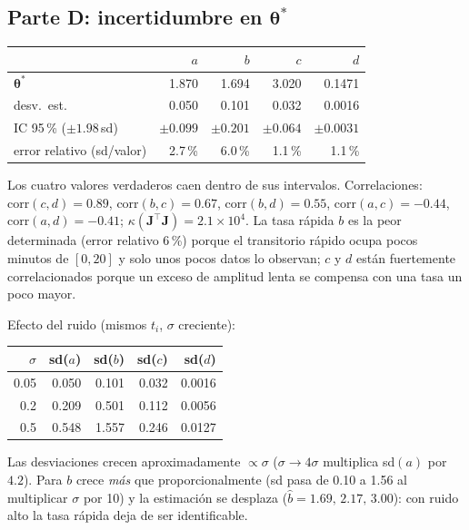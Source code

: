 \documentclass[11pt,letterpaper]{article}
\newcommand{\tht}{\boldsymbol{\theta}}
\begin{document}
\subsection*{Parte D: incertidumbre en $\tht^\ast$}
\begin{center}\small
\begin{tabular}{lrrrr}
\toprule
& $a$ & $b$ & $c$ & $d$\\
\midrule
$\tht^\ast$ & 1.870 & 1.694 & 3.020 & 0.1471\\
desv.\ est. & 0.050 & 0.101 & 0.032 & 0.0016\\
IC 95\,\% ($\pm1.98\,$sd) & $\pm0.099$ & $\pm0.201$ & $\pm0.064$ & $\pm0.0031$\\
error relativo (sd/valor) & 2.7\,\% & 6.0\,\% & 1.1\,\% & 1.1\,\%\\
\bottomrule
\end{tabular}
\end{center}
Los cuatro valores verdaderos caen dentro de sus intervalos. Correlaciones: $\mathrm{corr}(c,d)=0.89$,
$\mathrm{corr}(b,c)=0.67$, $\mathrm{corr}(b,d)=0.55$, $\mathrm{corr}(a,c)=-0.44$, $\mathrm{corr}(a,d)=-0.41$;
$\kappa(\mathbf J^\top\mathbf J)=2.1\times10^4$. La tasa r\'apida $b$ es la peor determinada (error relativo $6$\,\%)
porque el transitorio r\'apido ocupa pocos minutos de $[0,20]$ y solo unos pocos datos lo observan; $c$ y $d$
est\'an fuertemente correlacionados porque un exceso de amplitud lenta se compensa con una tasa un poco mayor.

Efecto del ruido (mismos $t_i$, $\sigma$ creciente):
\begin{center}\small
\begin{tabular}{rrrrr}
\toprule
$\sigma$ & sd($a$) & sd($b$) & sd($c$) & sd($d$)\\
\midrule
0.05 & 0.050 & 0.101 & 0.032 & 0.0016\\
0.2 & 0.209 & 0.501 & 0.112 & 0.0056\\
0.5 & 0.548 & 1.557 & 0.246 & 0.0127\\
\bottomrule
\end{tabular}
\end{center}
Las desviaciones crecen aproximadamente $\propto\sigma$ ($\sigma\to4\sigma$ multiplica sd$(a)$ por $4.2$). Para $b$ crece
\emph{m\'as} que proporcionalmente (sd pasa de 0.10 a 1.56 al multiplicar $\sigma$ por 10) y la estimaci\'on se
desplaza ($\hat b=1.69,\,2.17,\,3.00$): con ruido alto la tasa r\'apida deja de ser identificable.
\end{document}
